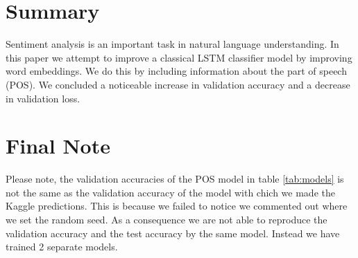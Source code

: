 \documentclass[conference]{IEEEtran}
\begin{document}
\section{Summary}
Sentiment analysis is an important task in natural language understanding. In this paper we attempt to improve a classical LSTM classifier model by improving word embeddings. We do this by including information about the part of speech (POS). We concluded a noticeable increase in validation accuracy and a decrease in validation loss.

\section{Final Note}  
\label{sec:note}
Please note, the validation accuracies of the POS model in table \ref{tab:models} is not the same as the validation accuracy of the model with chich we made the Kaggle predictions. This is because we failed to notice we commented out where we set the random seed. As a consequence we are not able to reproduce the validation accuracy and the test accuracy by the same model. Instead we have trained 2 separate models.
	
	

    \clearpage
    
\end{document}
